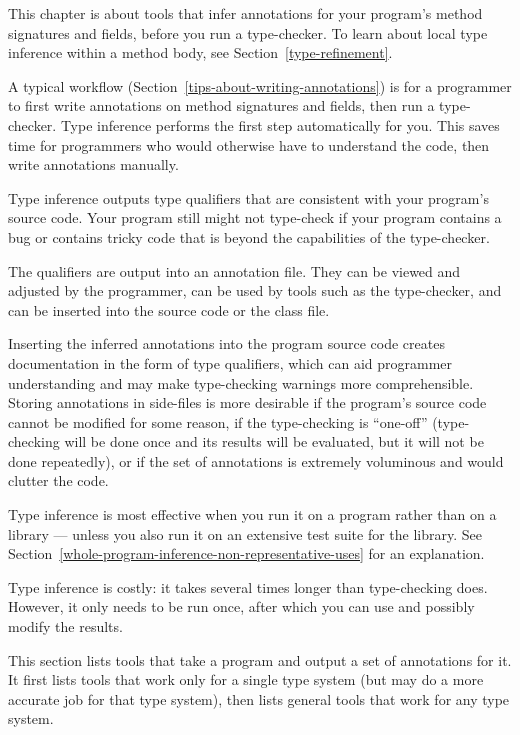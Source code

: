 \htmlhr
{}

This chapter is about tools that infer annotations for your
program's method signatures and fields, before you run a type-checker.
To learn about local type inference within a method body,
see Section~\ref{type-refinement}.

A typical workflow (Section~\ref{tips-about-writing-annotations}) is for a
programmer to first write annotations on method signatures and fields, then
run a type-checker.  Type inference performs the first step automatically
for you.  This saves time for programmers who would otherwise have to
understand the code, then write annotations manually.

Type inference outputs type qualifiers that are consistent with your
program's source code.  Your program still might not type-check if your
program contains a bug or contains tricky code that is beyond the
capabilities of the type-checker.

The qualifiers are output into an annotation file.  They can be viewed and
adjusted by the programmer, can be used by tools such as the type-checker,
and can be inserted into the source code or the class file.

Inserting the inferred annotations into the program source code creates documentation in the form of type
qualifiers, which can aid programmer understanding and may make
type-checking warnings more comprehensible.
Storing annotations in side-files is more desirable if the program's source code cannot
be modified for some reason, if the type-checking is ``one-off'' (type-checking will
be done once and its results will be evaluated, but it will not be done
repeatedly), or if the set of annotations is extremely voluminous and would
clutter the code.


Type inference is most effective when you run it on a program rather than
on a library --- unless you also run it on an extensive test suite for the
library.  See Section~\ref{whole-program-inference-non-representative-uses}
for an explanation.


Type inference is costly:  it takes several times longer than
type-checking does.  However, it only needs to be run once, after which
you can use and possibly modify the results.



This section lists tools that take a program and output a set of
annotations for it.
It first lists tools that work only for a single type system (but may do a
more accurate job for that type system),
then lists general tools that work for any type system.

